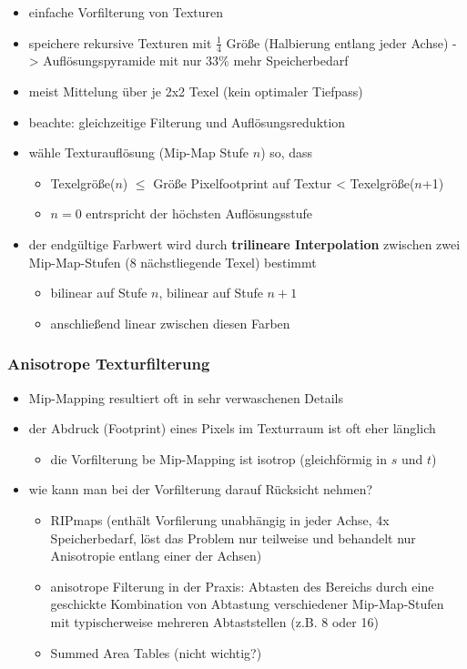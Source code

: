 \documentclass[paper=a4, fontsize=11pt]{scrartcl} %
\numberwithin{equation}{section} %
\numberwithin{figure}{section} %
\numberwithin{table}{section} %
\begin{document}
\begin{itemize}
\item einfache Vorfilterung von Texturen
\item speichere rekursive Texturen mit $\frac{1}{4}$ Größe (Halbierung entlang jeder Achse) -> Auflösungspyramide mit nur 33\% mehr Speicherbedarf
\item meist Mittelung über je 2x2 Texel (kein optimaler Tiefpass)
\item beachte: gleichzeitige Filterung und Auflösungsreduktion
\item wähle Texturauflösung (Mip-Map Stufe $n$) so, dass
\begin{itemize}
\item Texelgröße($n$) $\le$ Größe Pixelfootprint auf Textur < Texelgröße($n$+1)
\item $n = 0$ entrspricht der höchsten Auflösungsstufe
\end{itemize}
\item der endgültige Farbwert wird durch \textbf{trilineare Interpolation} zwischen zwei Mip-Map-Stufen (8 nächstliegende Texel) bestimmt
\begin{itemize}
\item bilinear auf Stufe $n$, bilinear auf Stufe $n+1$
\item anschließend linear zwischen diesen Farben
\end{itemize}
\end{itemize}

\subsubsection{Anisotrope Texturfilterung}

\begin{itemize}
\item Mip-Mapping resultiert oft in sehr verwaschenen Details
\item der Abdruck (Footprint) eines Pixels im Texturraum ist oft eher länglich
\begin{itemize}
\item die Vorfilterung be Mip-Mapping ist isotrop (gleichförmig in $s$ und $t$)
\end{itemize}
\item wie kann man bei der Vorfilterung darauf Rücksicht nehmen?
\begin{itemize}
\item RIPmaps (enthält Vorfilerung unabhängig in jeder Achse, 4x Speicherbedarf, löst das Problem nur teilweise und behandelt nur Anisotropie entlang einer der Achsen)
\item anisotrope Filterung in der Praxis: Abtasten des Bereichs durch eine geschickte Kombination von Abtastung verschiedener Mip-Map-Stufen mit typischerweise mehreren Abtaststellen (z.B. 8 oder 16)
\item Summed Area Tables (nicht wichtig?)
\end{itemize}
\end{itemize}
\end{document}
